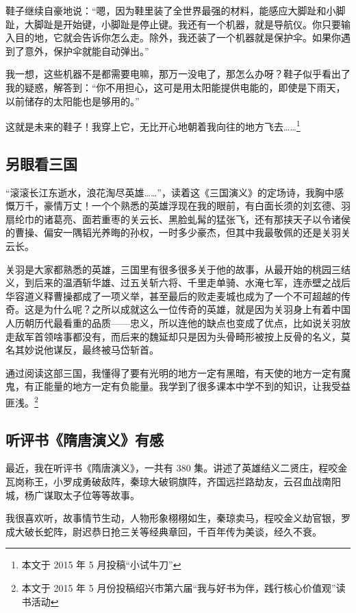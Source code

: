 \documentclass[UTF8,a4paper,titlepage,twoside,10.5pt]{article}
\begin{document}
鞋子继续自豪地说：“嗯，因为鞋里装了全世界最强的材料，能感应大脚趾和小脚趾，大脚趾是开始键，小脚趾是停止键。我还有一个机器，就是导航仪。你只要输入目的地，它就会告诉你怎么走。除外，我还装了一个机器就是保护伞。如果你遇到了意外，保护伞就能自动弹出。”

我一想，这些机器不是都需要电嘛，那万一没电了，那怎么办呀？鞋子似乎看出了我的疑惑，解答到：“你不用担心，这可是用太阳能提供电能的，即使是下雨天，以前储存的太阳能也是够用的。”

这就是未来的鞋子！我穿上它，无比开心地朝着我向往的地方飞去……\footnote{本文于 2015 年 5 月投稿“小试牛刀”}

\subsection{另眼看三国}
\label{sec:orgad0166d}

“滚滚长江东逝水，浪花淘尽英雄……”，读着这《三国演义》的定场诗，我胸中感慨万千，豪情万丈！一个个熟悉的英雄浮现在我的眼前，有白面长须的刘玄德、羽扇纶巾的诸葛亮、面若重枣的关云长、黑脸虬髯的猛张飞，还有那挟天子以令诸侯的曹操、偏安一隅韬光养晦的孙权，一时多少豪杰，但其中我最敬佩的还是关羽关云长。

关羽是大家都熟悉的英雄，三国里有很多很多关于他的故事，从最开始的桃园三结义，到后来的温酒斩华雄、过五关斩六将、千里走单骑、水淹七军，连赤壁之战后华容道义释曹操都成了一项义举，甚至最后的败走麦城也成为了一个不可超越的传奇。这是为什么呢？之所以成就这么一位传奇的英雄，就是因为关羽身上有着中国人历朝历代最看重的品质——忠义，所以连他的缺点也变成了优点，比如说关羽放走敌军首领啥事都没有，而后来的魏延却只是因为头骨畸形被按上反骨的名义，莫名其妙说他谋反，最终被马岱斩首。

通过阅读这部三国，我懂得了要有光明的地方一定有黑暗，有天使的地方一定有魔鬼，有正能量的地方一定有负能量。我学到了很多课本中学不到的知识，让我受益匪浅。\footnote{本文于 2015 年 5 月份投稿绍兴市第六届“我与好书为伴，践行核心价值观”读书活动}

\subsection{听评书《隋唐演义》有感}
\label{sec:orgf34959b}

最近，我在听评书《隋唐演义》，一共有 380 集。讲述了英雄结义二贤庄，程咬金瓦岗称王，小罗成勇破敌阵，秦琼大破铜旗阵，齐国远拦路劫友，云召血战南阳城，杨广谋取太子位等等故事。

我很喜欢听，故事情节生动，人物形象栩栩如生，秦琼卖马，程咬金义劫官银，罗成大破长蛇阵，尉迟恭日抢三关等经典章回，千百年传为美谈，经久不衰。
\end{document}
